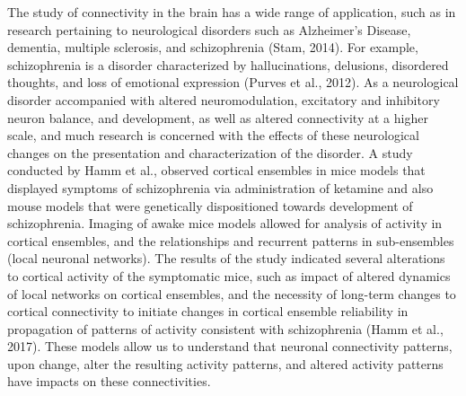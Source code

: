 \documentclass[11pt,titlepage]{article}
\begin{document}
The study of connectivity in the brain has a wide range of application, such as in research pertaining to neurological disorders such as Alzheimer's Disease, dementia, multiple sclerosis, and schizophrenia (Stam, 2014). For example, schizophrenia is a disorder characterized by hallucinations, delusions, disordered thoughts, and loss of emotional expression (Purves et al., 2012). As a neurological disorder accompanied with altered neuromodulation, excitatory and inhibitory neuron balance, and development, as well as altered connectivity at a higher scale, and much research is concerned with the effects of these neurological changes on the presentation and characterization of the disorder. A study conducted by Hamm et al., observed cortical ensembles in mice models that displayed symptoms of schizophrenia via administration of ketamine and also mouse models that were genetically dispositioned towards development of schizophrenia. Imaging of awake mice models allowed for analysis of activity in cortical ensembles, and the relationships and recurrent patterns in sub-ensembles (local neuronal networks). The results of the study indicated several alterations to cortical activity of the symptomatic mice, such as impact of altered dynamics of local networks on cortical ensembles, and the necessity of long-term changes to cortical connectivity to initiate changes in cortical ensemble reliability in propagation of patterns of activity consistent with schizophrenia (Hamm et al., 2017). These models allow us to understand that neuronal connectivity patterns, upon change, alter the resulting activity patterns, and altered activity patterns have impacts on these connectivities. \par
\end{document}
